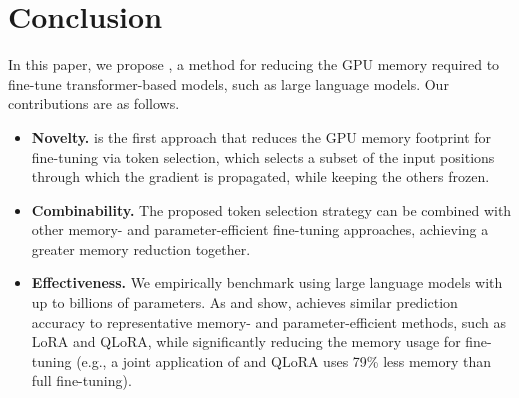 \section{Conclusion}
\label{sec:conclusion}
In this paper, we propose \method, a method for reducing the GPU memory required to fine-tune transformer-based models, such as large language models. 
Our contributions are as follows.
\begin{itemize}[leftmargin=1em,topsep=-2pt,itemsep=-3pt]
	\item \textbf{Novelty.} \method is the first approach that reduces the GPU memory footprint for fine-tuning via token selection, 
	which selects a subset of the input positions through which the gradient is propagated, while keeping the others frozen.
	\item \textbf{Combinability.} The proposed token selection strategy can be combined with other memory- and parameter-efficient fine-tuning approaches, achieving a greater memory reduction together.
	\item \textbf{Effectiveness.} We empirically benchmark \method using large language models with up to billions of parameters. 
	As  and  show, \method achieves similar prediction accuracy to representative memory- and parameter-efficient methods, such as LoRA and QLoRA, 
	while significantly reducing the memory usage for fine-tuning (e.g., a joint application of \method and QLoRA uses 79\% less memory than full fine-tuning).
\end{itemize}






